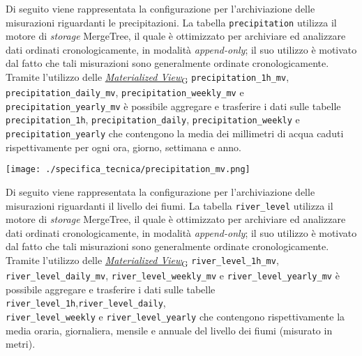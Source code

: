 Di seguito viene rappresentata la configurazione per l'archiviazione delle misurazioni riguardanti le precipitazioni.
La tabella \texttt{precipitation} utilizza il motore di \textit{storage} MergeTree, il quale è ottimizzato per archiviare ed analizzare dati ordinati cronologicamente,
in modalità \textit{append-only}; il suo utilizzo è motivato dal fatto che tali misurazioni sono generalmente ordinate cronologicamente.
Tramite l'utilizzo delle \href{https://7last.github.io/docs/pb/documentazione-interna/glossario\#materialized-view}{\textit{Materialized View}\textsubscript{G}} \texttt{precipitation\_1h\_mv}, \texttt{precipitation\_daily\_mv}, \texttt{precipitation\_weekly\_mv} e \\\texttt{precipitation\_yearly\_mv} è possibile aggregare e trasferire i dati sulle tabelle \\\texttt{precipitation\_1h}, \texttt{precipitation\_daily}, \texttt{precipitation\_weekly} e \texttt{precipitation\_yearly}
che contengono la media dei millimetri di acqua caduti rispettivamente per ogni ora, giorno, settimana e anno.
\begin{center}
	\texttt{[image: ./specifica\_tecnica/precipitation\_mv.png]}
\end{center}

Di seguito viene rappresentata la configurazione per l'archiviazione delle misurazioni riguardanti il livello dei fiumi.
La tabella \texttt{river\_level} utilizza il motore di \textit{storage} MergeTree, il quale è ottimizzato per archiviare ed analizzare dati ordinati cronologicamente,
in modalità \textit{append-only}; il suo utilizzo è motivato dal fatto che tali misurazioni sono generalmente ordinate cronologicamente.
Tramite l'utilizzo delle \href{https://7last.github.io/docs/pb/documentazione-interna/glossario\#materialized-view}{\textit{Materialized View}\textsubscript{G}} \texttt{river\_level\_1h\_mv}, \texttt{river\_level\_daily\_mv}, \texttt{river\_level\_weekly\_mv} e \texttt{river\_level\_yearly\_mv}
è possibile aggregare e trasferire i dati sulle tabelle \texttt{river\_level\_1h},\texttt{river\_level\_daily},\\ \texttt{river\_level\_weekly} e \texttt{river\_level\_yearly}
che contengono rispettivamente la media oraria, giornaliera, mensile e annuale del livello dei fiumi (misurato in metri).

